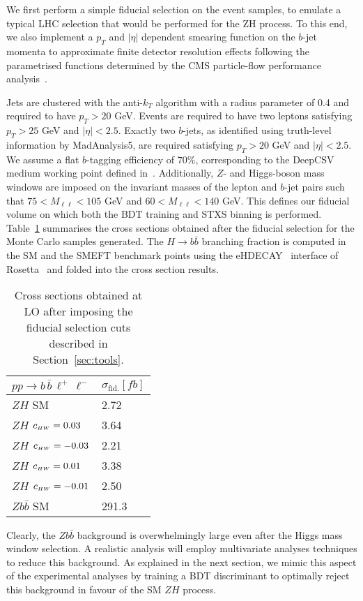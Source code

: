 We first perform a simple fiducial selection on the event samples, to emulate a typical LHC selection that would be performed for the ZH process. To this end, we also implement a $p_T$ and $|\eta|$ dependent smearing function on the $b$-jet momenta to approximate finite detector resolution effects following the parametrised functions determined by the CMS particle-flow performance analysis~\cite{Sirunyan:2017ulk}.

Jets are clustered with the anti-$k_T$ algorithm with a radius parameter of 0.4 and required to have $p_T > 20$ GeV. Events are required to have two leptons satisfying $p_T > 25$ GeV and $|\eta|< 2.5$. Exactly two $b$-jets, as identified using truth-level information by {\sc MadAnalysis5}, are required satisfying $p_T > 20$ GeV and $|\eta|< 2.5$. We assume a flat $b$-tagging efficiency of $70\%$, corresponding to the DeepCSV medium working point defined in~\cite{Sirunyan:2017ezt}. Additionally, $Z$- and Higgs-boson mass windows are imposed on the invariant masses of the lepton and $b$-jet pairs such that $75 < M_{\ell\ell} < 105$ GeV and  $60 < M_{\ell\ell} < 140$ GeV. This defines our fiducial volume on which both the BDT training and STXS binning is performed. Table~\ref{tab:FiducialXS} summarises the cross sections obtained after the fiducial selection for the Monte Carlo samples generated. The $H\to b\bar{b}$ branching fraction is computed in the SM and the SMEFT benchmark points using the e{\sc HDECAY}~\cite{Contino:2014aaa} interface of {\sc Rosetta}~\cite{Falkowski:2015wza} and folded into the cross section results.
%
\begin{table}[h!]
    \centering
    \begin{tabular}{|l|l|}
        \hline
        $pp\to b\,\bar{b}\,\ell^+\,\ell^-$& $\sigma_{\text{fid.}} [fb]$\tabularnewline
        \hline
        $ZH$ SM&2.72\tabularnewline
        $ZH$ $c_{\scriptscriptstyle HW} = 0.03$&3.64\tabularnewline
        $ZH$ $c_{\scriptscriptstyle HW} = -0.03$&2.21\tabularnewline
        $ZH$ $c_{\scriptscriptstyle HW} = 0.01$&3.38\tabularnewline
        $ZH$ $c_{\scriptscriptstyle HW} = -0.01$&2.50\tabularnewline
        $Z b\bar{b}$ SM&291.3\tabularnewline
        \hline
    \end{tabular}
    \caption{\label{tab:FiducialXS} Cross sections obtained at LO after imposing the fiducial selection cuts described in Section~\ref{sec:tools}.}
\end{table}
Clearly, the $Z b\bar{b}$ background is overwhelmingly large even after the Higgs mass
window selection. A realistic analysis will employ multivariate analyses techniques to
reduce this background. As explained in the next section, we mimic this aspect of the
experimental analyses by training a BDT discriminant to optimally reject this background
in favour of the SM $ZH$ process.

